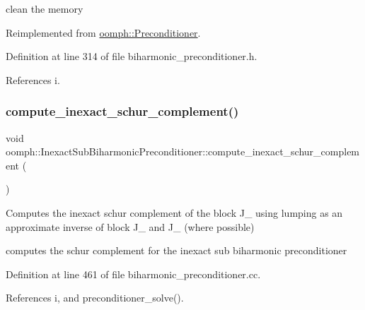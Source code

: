 clean the memory 



Reimplemented from \hyperlink{classoomph_1_1Preconditioner_a46c31c416829bedcd9db238431262027}{oomph\+::\+Preconditioner}.



Definition at line 314 of file biharmonic\+\_\+preconditioner.\+h.



References i.

\mbox{\label{classoomph_1_1InexactSubBiharmonicPreconditioner_a0ccbc50db6a0f30fb872d60a490cee64}} 
\subsubsection{\texorpdfstring{compute\+\_\+inexact\+\_\+schur\+\_\+complement()}{compute\_inexact\_schur\_complement()}}
{\footnotesize\ttfamily void oomph\+::\+Inexact\+Sub\+Biharmonic\+Preconditioner\+::compute\+\_\+inexact\+\_\+schur\+\_\+complement (\begin{DoxyParamCaption}{ }\end{DoxyParamCaption})}



Computes the inexact schur complement of the block J\+\_ using lumping as an approximate inverse of block J\+\_ and J\+\_ (where possible) 

computes the schur complement for the inexact sub biharmonic preconditioner 

Definition at line 461 of file biharmonic\+\_\+preconditioner.\+cc.



References i, and preconditioner\+\_\+solve().

\mbox{\label{classoomph_1_1InexactSubBiharmonicPreconditioner_ae4fea70f49be39011a6bc4f794188544}} 

